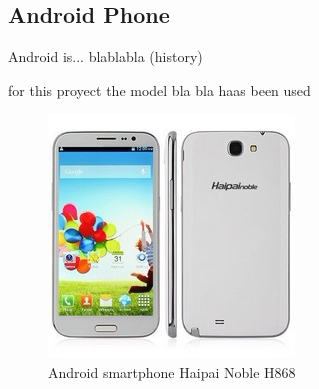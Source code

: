 






\newpage
\subsection{Android Phone}

Android is... blablabla  (history)


for this proyect the model bla bla haas been used

	\begin{figure}[H]
			\centering
			\includegraphics[scale=0.8]{images/ProjectComponents/android.jpg}
			\caption{Android smartphone Haipai Noble H868}
			\label{}
	\end{figure}
	\bigskip

